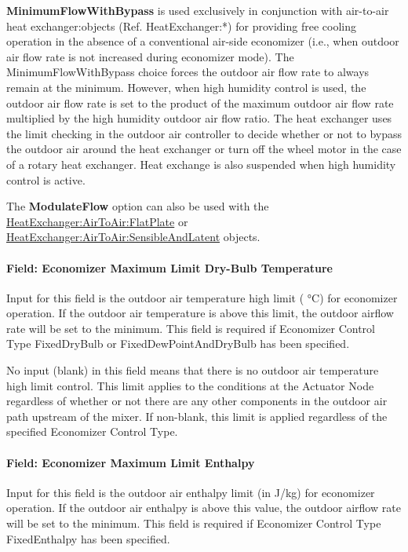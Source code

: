 \textbf{MinimumFlowWithBypass} is used exclusively in conjunction with air-to-air heat exchanger:objects (Ref. HeatExchanger:*) for providing free cooling operation in the absence of a conventional air-side economizer (i.e., when outdoor air flow rate is not increased during economizer mode). The MinimumFlowWithBypass choice forces the outdoor air flow rate to always remain at the minimum. However, when high humidity control is used, the outdoor air flow rate is set to the product of the maximum outdoor air flow rate multiplied by the high humidity outdoor air flow ratio. The heat exchanger uses the limit checking in the outdoor air controller to decide whether or not to bypass the outdoor air around the heat exchanger or turn off the wheel motor in the case of a rotary heat exchanger. Heat exchange is also suspended when high humidity control is active.

The \textbf{ModulateFlow} option can also be used with the \hyperref[heatexchangerairtoairflatplate]{HeatExchanger:AirToAir:FlatPlate} or \hyperref[heatexchangerairtoairsensibleandlatent]{HeatExchanger:AirToAir:SensibleAndLatent} objects.

\paragraph{Field: Economizer Maximum Limit Dry-Bulb Temperature}\label{field-economizer-maximum-limit-dry-bulb-temperature}

Input for this field is the outdoor air temperature high limit ( °C) for economizer operation. If the outdoor air temperature is above this limit, the outdoor airflow rate will be set to the minimum. This field is required if Economizer Control Type FixedDryBulb or FixedDewPointAndDryBulb has been specified.

No input (blank) in this field means that there is no outdoor air temperature high limit control. This limit applies to the conditions at the Actuator Node regardless of whether or not there are any other components in the outdoor air path upstream of the mixer. If non-blank, this limit is applied regardless of the specified Economizer Control Type.

\paragraph{Field: Economizer Maximum Limit Enthalpy}\label{field-economizer-maximum-limit-enthalpy}

Input for this field is the outdoor air enthalpy limit (in J/kg) for economizer operation. If the outdoor air enthalpy is above this value, the outdoor airflow rate will be set to the minimum. This field is required if Economizer Control Type FixedEnthalpy has been specified.

